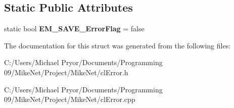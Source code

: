 \subsection*{Static Public Attributes}
\begin{DoxyCompactItemize}
\item 
\hypertarget{structcl_error_a14bf1d0945186ea3a3edc3d4fbf84f34}{
static bool {\bfseries EM\_\-SAVE\_\-ErrorFlag} = false}
\label{structcl_error_a14bf1d0945186ea3a3edc3d4fbf84f34}

\end{DoxyCompactItemize}


The documentation for this struct was generated from the following files:\begin{DoxyCompactItemize}
\item 
C:/Users/Michael Pryor/Documents/Programming 09/MikeNet/Project/MikeNet/clError.h\item 
C:/Users/Michael Pryor/Documents/Programming 09/MikeNet/Project/MikeNet/clError.cpp\end{DoxyCompactItemize}
